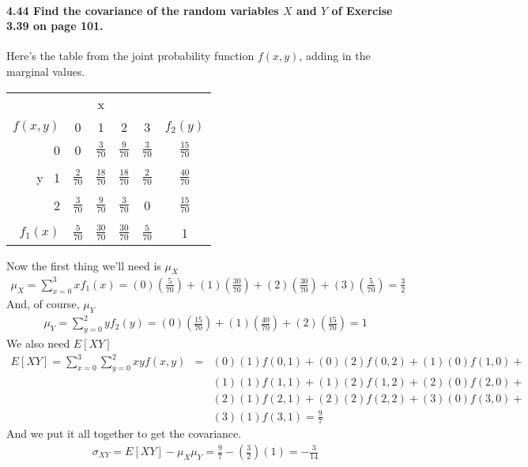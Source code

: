 \documentclass{article}
\begin{document}
\paragraph{4.44 Find the covariance of the random variables $X$ and $Y$ of 
Exercise 3.39 on page 101.\\}
Here's the table from the joint probability function $f(x,y)$, adding in the 
marginal values.
\begin{center}
\begin{tabular}{r|c c c c|c}
          & & x & & &\\
 $f(x,y)$ & 0 & 1 & 2 & 3 & $f_2(y)$\\
\hline
       0 & 0 & $\frac{3}{70}$ & $\frac{9}{70}$ & $\frac{3}{70}$ & 
       													    $\frac{15}{70}$\\
       &&&&\\
y$\;\;\;$1 & $\frac{2}{70}$ & $\frac{18}{70}$ & $\frac{18}{70}$ & 
											$\frac{2}{70}$ & $\frac{40}{70}$\\
       &&&&\\
       2 & $\frac{3}{70}$ & $\frac{9}{70}$ & $\frac{3}{70}$ & 0 & 
       													     $\frac{15}{70}$\\
	   &&&&\\
\hline
$f_1(x)$ & $\frac{5}{70}$ & $\frac{30}{70}$ & $\frac{30}{70}$ & $\frac{5}{70}$ &
																		1
\end{tabular}
\end{center}
Now the first thing we'll need is $\mu_X$
\begin{eqnarray*}
\mu_X = \sum_{x=0}^3 xf_1(x) = (0)\left(\frac{5}{70}\right)+
							(1)\left(\frac{30}{70}\right)+
							(2)\left(\frac{30}{70}\right)+
							(3)\left(\frac{5}{70}\right)
							= \frac{3}{2}
\end{eqnarray*}
And, of course, $\mu_Y$
\begin{eqnarray*}
\mu_Y = \sum_{y=0}^2 yf_2(y) = (0)\left(\frac{15}{70}\right)+
							(1)\left(\frac{40}{70}\right)+
							(2)\left(\frac{15}{70}\right)
							= 1
\end{eqnarray*}
We also need $E[XY]$
\begin{eqnarray*}
E[XY] = \sum_{x=0}^3\sum_{y=0}^2 xyf(x,y) & = & (0)(1)f(0,1)+
				(0)(2)f(0,2) + (1)(0)f(1,0) +\\
				& & (1)(1)f(1,1) + (1)(2)f(1,2) + (2)(0)f(2,0) +\\
				& & (2)(1)f(2,1) + (2)(2)f(2,2) + (3)(0)f(3,0) +\\
				& & (3)(1)f(3,1) = \frac{9}{7}
\end{eqnarray*}
And we put it all together to get the covariance.
\begin{eqnarray*}
\sigma_{XY} = E[XY] - \mu_X\mu_Y = \frac{9}{7}-\left(\frac{3}{2}\right)(1)
	= \boxed{-\frac{3}{14}}
\end{eqnarray*}
\end{document}
